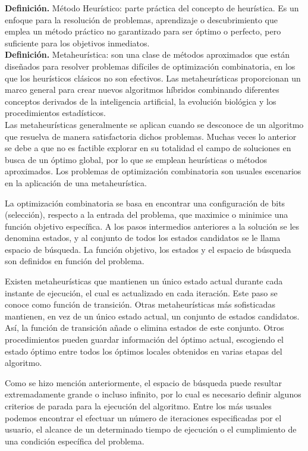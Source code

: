 \documentclass[a4paper,12pt]{book}
\begin{document}
	\textbf{Definición.} Método Heurístico: parte práctica del concepto de heurística. Es un enfoque para la resolución de problemas, aprendizaje o descubrimiento que emplea un método práctico no garantizado para ser óptimo o perfecto, pero suficiente para los objetivos inmediatos. \\
	
	\textbf{Definición.} Metaheurística: son una clase de métodos aproximados que están diseñados para resolver problemas difíciles de optimización combinatoria, en los que los heurísticos clásicos no son efectivos. Las metaheurísticas proporcionan un marco general para crear nuevos algoritmos híbridos combinando diferentes conceptos derivados de la inteligencia artificial, la evolución biológica y los procedimientos estadísticos. \\
	
	Las metaheurísticas generalmente se aplican cuando se desconoce de un algoritmo que resuelva de manera satisfactoria dichos problemas. Muchas veces lo anterior se debe a que no es factible explorar en su totalidad el campo de soluciones en busca de un óptimo global, por lo que se emplean heurísticas o métodos aproximados. Los problemas de optimización combinatoria son usuales escenarios en la aplicación de una metaheurística.
	
	La optimización combinatoria se basa en encontrar una configuración de bits (selección), respecto a la entrada del problema, que maximice o minimice una función objetivo específica. A los pasos intermedios anteriores a la solución se les denomina estados, y al conjunto de todos los estados candidatos se le llama espacio de búsqueda. La función objetivo, los estados y el espacio de búsqueda son definidos en función del problema.
	
	Existen metaheurísticas que mantienen un único estado actual durante cada instante de ejecución, el cual es actualizado en cada iteración. Este paso se conoce como función de transición. Otras metaheurísticas más sofisticadas mantienen, en vez de un único estado actual, un conjunto de estados candidatos. Así, la función de transición añade o elimina estados de este conjunto. Otros procedimientos pueden guardar información del óptimo actual, escogiendo el estado óptimo entre todos los óptimos locales obtenidos en varias etapas del algoritmo.
	
	Como se hizo mención anteriormente, el espacio de búsqueda puede resultar extremadamente grande o incluso infinito, por lo cual es necesario definir algunos criterios de parada para la ejecución del algoritmo. Entre los más usuales podemos encontrar el efectuar un número de iteraciones especificadas por el usuario, el alcance de un determinado tiempo de ejecución o el cumplimiento de una condición específica del problema. \\
	
\end{document}
